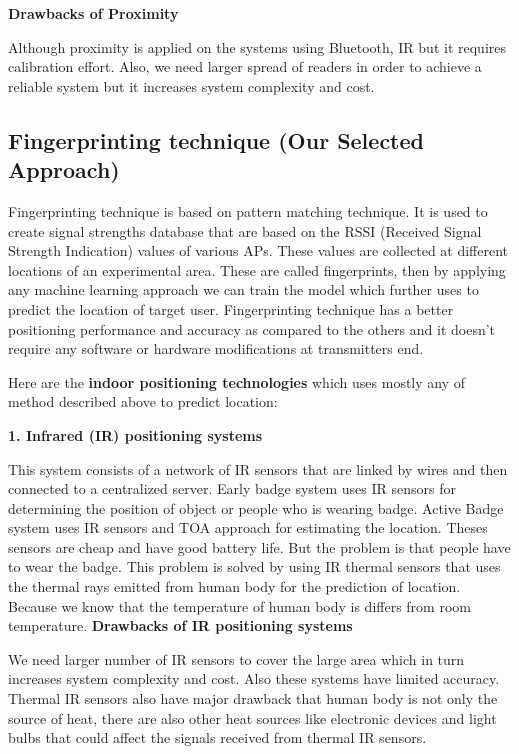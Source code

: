 \textbf{Drawbacks of Proximity}

Although proximity is applied on the systems using Bluetooth, IR but it requires calibration effort\cite{Sakpere2017ASS}. Also, we need larger spread of readers in order to achieve a reliable system but it increases system complexity and cost.

\subsection{Fingerprinting technique (Our Selected Approach)}
Fingerprinting technique is based on pattern matching technique. It is used to create signal strengths database that are based on the RSSI (Received Signal Strength Indication) values of various APs. These values are collected at different locations of an experimental area. These are called fingerprints, then by applying any machine learning approach we can train the model which further uses to predict the location of target user. Fingerprinting technique has a better positioning performance and accuracy as compared to the others and it doesn’t require any software or hardware modifications at transmitters end.

Here are the \textbf{indoor positioning technologies} which uses mostly any of method described above to predict location:

\textbf{1. Infrared (IR) positioning systems}

This system consists of a network of IR sensors that are linked by wires and then connected to a centralized server. Early badge system uses IR sensors for determining the position of object or people who is wearing badge.  Active Badge system uses IR sensors and TOA approach for estimating the location. Theses sensors are cheap and have good battery life. But the problem is that people have to wear the badge. This problem is solved by using IR thermal sensors\cite{Sakpere2017ASS} that uses the thermal rays emitted from human body for the prediction of location. Because we know that the temperature of human body is differs from room temperature.
\clearpage
\textbf{Drawbacks of IR positioning systems}

We need larger number of IR sensors to cover the large area which in turn increases system complexity and cost. Also these systems have limited accuracy. Thermal IR sensors also have major drawback that human body is not only the source of heat, there are also other heat sources like electronic devices and light bulbs that could affect the signals received from thermal IR sensors.

